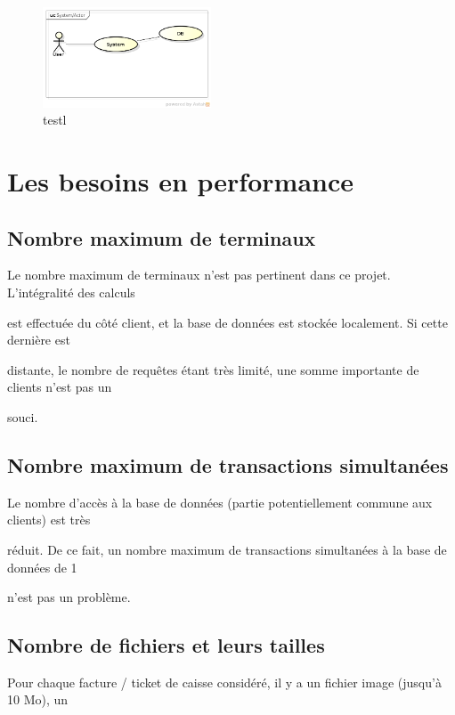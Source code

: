 \documentclass[a4paper,10pt]{article}
\begin{document}
\begin{figure}[!ht] %
  \includegraphics[width=5cm]{SystemActor.png} %
  \caption{testl} %
  \label{test} %
\end{figure} %


\section{Les besoins en performance}

\subsection{Nombre maximum de terminaux}

Le nombre maximum de terminaux n’est pas pertinent dans ce projet. L’intégralité des calculs 

est effectuée du côté client, et la base de données est stockée localement. Si cette dernière est 

distante, le nombre de requêtes étant très limité, une somme importante de clients n’est pas un 

souci.

\subsection{Nombre maximum de transactions simultanées}

Le nombre d’accès à la base de données (partie potentiellement commune aux clients) est très 

réduit. De ce fait, un nombre maximum de transactions simultanées à la base de données de 1 

n’est pas un problème.

\subsection{Nombre de fichiers et leurs tailles}

Pour chaque facture / ticket de caisse considéré, il y a un fichier image (jusqu’à 10 Mo), un 
\end{document}
